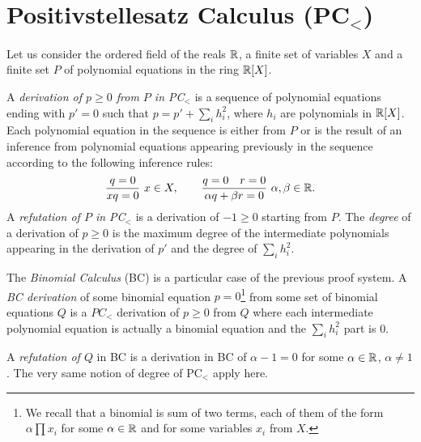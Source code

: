 \documentclass[a4paper,twoside,justified]{tufte-handout}
\begin{document}
 

\section{Positivstellesatz Calculus (PC$_<$)}

Let us consider the ordered field of the reals $\mathbb{R}$, a finite set of variables $X$ and a finite set $P$ of polynomial equations in the ring $\mathbb{R}[X]$. 

A \emph{derivation of  $p\geq 0$ from $P$ in PC$_<$} is a sequence of polynomial equations ending with $p'=0$ such that $p=p'+\sum_i h_i^2$, where $h_i$ are polynomials in $\mathbb{R}[X]$.  
Each polynomial equation in the sequence is either from $P$ or is the result of an inference from polynomial equations appearing previously in the sequence according to the following inference rules:
\begin{equation}
\label{eq:positivstellesatz-inference}
    \frac{q=0}{xq=0}\ x\in X,\qquad \frac{q=0\quad r=0}{\alpha q +\beta r=0}\ \alpha,\beta\in \mathbb{R}.
\end{equation}
%
%
A \emph{refutation of $P$ in PC$_<$} is a derivation of $-1\geq 0$ starting from $P$. 
The \emph{degree} of a derivation of $p\geq 0$ is the maximum degree of the intermediate polynomials appearing in the derivation of $p'$ and the degree of $\sum_i h_i^2$.
 
 
The \emph{Binomial Calculus} (BC) is a particular case of the previous proof system. A \emph{BC derivation} of some binomial equation $p=0$\footnote{
We recall that a binomial is sum of two terms, each of them of the form $\alpha\prod x_i$ for some $\alpha\in \mathbb{R}$ and for some variables $x_i$ from $X$.
} from some set of binomial equations $Q$
is a $PC_<$ derivation of $p\geq 0$ from $Q$ where each intermediate polynomial equation is actually a binomial equation and the $\sum_ih_i^2$ part is $0$.

A \emph{refutation of $Q$} in BC is a derivation in BC of $\alpha -1=0$ for some $\alpha\in \mathbb{R}$, $\alpha\neq 1$. The very same notion of degree of PC$_<$ apply here.

%
%
\end{document}
